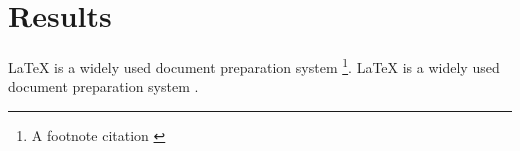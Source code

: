 \renewcommand*\chapterpagestyle{scrheadings}
\chapter{Results}
LaTeX is a widely used document preparation system \footnote{A footnote citation \cite{wiki:latex}}.
\newline
LaTeX is a widely used document preparation system \cite{wiki:latex}.

